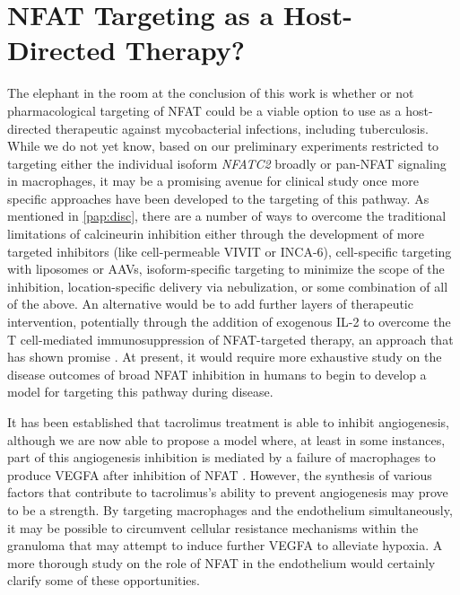 \section{NFAT Targeting as a Host\hyp{}Directed Therapy?}\label{nfathdt}

The elephant in the room at the conclusion of this work is whether or not pharmacological targeting of NFAT could be a viable option to use as a host\hyp{}directed therapeutic against mycobacterial infections, including tuberculosis. While we do not yet know, based on our preliminary experiments restricted to targeting either the individual isoform \textit{NFATC2} broadly or pan-NFAT signaling in macrophages, it may be a promising avenue for clinical study once more specific approaches have been developed to the targeting of this pathway. As mentioned in \autoref{pap:disc}, there are a number of ways to overcome the traditional limitations of calcineurin inhibition either through the development of more targeted inhibitors (like cell\hyp{}permeable VIVIT or INCA\hyp{}6), cell\hyp{}specific targeting with liposomes or AAVs, isoform\hyp{}specific targeting to minimize the scope of the inhibition, location\hyp{}specific delivery via nebulization, or some combination of all of the above. An alternative would be to add further layers of therapeutic intervention, potentially through the addition of exogenous IL-2 to overcome the T cell-mediated immunosuppression of NFAT-targeted therapy, an approach that has shown promise \citep{Whitehouse2017}. At present, it would require more exhaustive study on the disease outcomes of broad NFAT inhibition in humans to begin to develop a model for targeting this pathway during disease.

It has been established that tacrolimus treatment is able to inhibit angiogenesis, although we are now able to propose a model where, at least in some instances, part of this angiogenesis inhibition is mediated by a failure of macrophages to produce VEGFA after inhibition of NFAT \citep{Shen2022, Turgut2011}. However, the synthesis of various factors that contribute to tacrolimus's ability to prevent angiogenesis may prove to be a strength. By targeting macrophages and the endothelium simultaneously, it may be possible to circumvent cellular resistance mechanisms within the granuloma that may attempt to induce further VEGFA to alleviate hypoxia. A more thorough study on the role of NFAT in the endothelium would certainly clarify some of these opportunities. 


